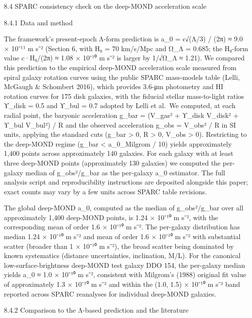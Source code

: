 \documentclass[11pt]{article}
\begin{document}
8.4 SPARC consistency check on the deep-MOND acceleration scale

8.4.1 Data and method

The framework's present-epoch Λ-form prediction is a\_0 = c√(Λ/3) / (2π) ≈ 9.0 × 10⁻¹¹ m s⁻² (Section 6, with H₀ = 70 km/s/Mpc and Ω\_Λ = 0.685; the H₀-form value c·H₀/(2π) ≈ 1.08 × 10⁻¹⁰ m s⁻² is larger by 1/√Ω\_Λ ≈ 1.21). We compared this prediction to the empirical deep-MOND acceleration scale measured from spiral galaxy rotation curves using the public SPARC mass-models table (Lelli, McGaugh \& Schombert 2016), which provides 3.6-μm photometry and HI rotation curves for 175 disk galaxies, with the fiducial stellar mass-to-light ratios ϒ\_disk = 0.5 and ϒ\_bul = 0.7 adopted by Lelli et al.~We computed, at each radial point, the baryonic acceleration g\_bar = (V\_gas² + ϒ\_disk V\_disk² + ϒ\_bul V\_bul²) / R and the observed acceleration g\_obs = V\_obs² / R in SI units, applying the standard cuts (g\_bar \textgreater{} 0, R \textgreater{} 0, V\_obs \textgreater{} 0). Restricting to the deep-MOND regime (g\_bar \textless{} a\_0\_Milgrom / 10) yields approximately 1,400 points across approximately 140 galaxies. For each galaxy with at least three deep-MOND points (approximately 130 galaxies) we computed the per-galaxy median of g\_obs²/g\_bar as the per-galaxy a\_0 estimator. The full analysis script and reproducibility instructions are deposited alongside this paper; exact counts may vary by a few units across SPARC table revisions.

The global deep-MOND a\_0, computed as the median of g\_obs²/g\_bar over all approximately 1,400 deep-MOND points, is 1.24 × 10⁻¹⁰ m s⁻², with the corresponding mean of order 1.6 × 10⁻¹⁰ m s⁻². The per-galaxy distribution has median 1.24 × 10⁻¹⁰ m s⁻² and mean of order 1.6 × 10⁻¹⁰ m s⁻² with substantial scatter (broader than 1 × 10⁻¹⁰ m s⁻²), the broad scatter being dominated by known systematics (distance uncertainties, inclination, M/L). For the canonical low-surface-brightness deep-MOND test galaxy DDO 154, the per-galaxy median yields a\_0 ≈ 1.0 × 10⁻¹⁰ m s⁻², consistent with Milgrom's (1988) original fit value of approximately 1.3 × 10⁻¹⁰ m s⁻² and within the (1.0, 1.5) × 10⁻¹⁰ m s⁻² band reported across SPARC reanalyses for individual deep-MOND galaxies.

8.4.2 Comparison to the Λ-based prediction and the literature
\end{document}
